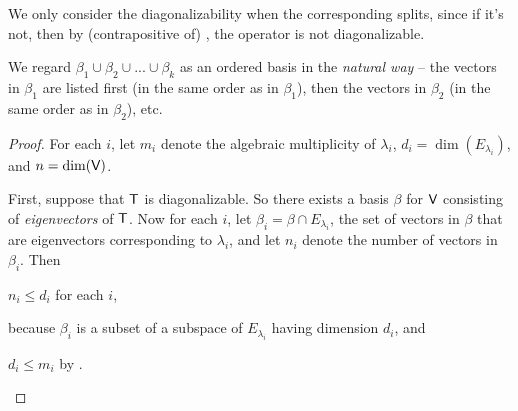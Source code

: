 \begin{remark} \label{remark 5.2.6}
We only consider the diagonalizability when the corresponding \CPOLY{} splits, since if it's not, then by (contrapositive of) , the operator is not diagonalizable.
\end{remark}

\begin{remark} \label{remark 5.2.7}
\RED{*}We regard \(\beta_1 \cup \beta_2 \cup ... \cup \beta_k\) as an ordered basis in the \emph{natural way} -- the vectors in \(\beta_1\) are listed first (in the same order as in \(\beta_1\)), then the vectors in \(\beta_2\) (in the same order as in \(\beta_2\)), etc.
\end{remark}

\begin{proof}
For each \(i\), let \(m_i\) denote the algebraic multiplicity of \(\lambda_i\), \(d_i = \dim(E_{\lambda_i})\), and \(n = \dim(\textsf{V})\).

First, suppose that \(\textsf{T}\) is diagonalizable.
So there exists a basis \(\beta\) for \(\textsf{V}\) consisting of \emph{eigenvectors} of \(\textsf{T}\).
Now for each \(i\), let \(\beta_i = \beta \cap E_{\lambda_i}\), the set of vectors in \(\beta\) that are eigenvectors corresponding to \(\lambda_i\),
and let \(n_i\) denote the number of vectors in \(\beta_i\).
Then
\begin{center}
    \(n_i \le d_i\) for each \(i\), \quad \quad {}
\end{center}
because \(\beta_i\) is a \LID{} subset of a subspace of \(E_{\lambda_i}\) having dimension \(d_i\), and
\begin{center}
    \(d_i \le m_i\) by . \quad \quad {}
\end{center}


\end{proof}
